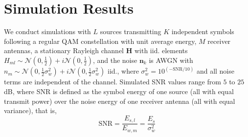 
\section{Simulation Results} \label{sec:simulations_wf}

%



We conduct simulations with $L$ sources transmitting $K$ independent symbols following a regular QAM constellation with unit average energy, $M$ receiver antennas, a stationary Rayleigh channel $\bm{H}$ with iid. elements $H_{ml}\sim\mathcal{N}(0,\frac{1}{2})+i\mathcal{N}(0,\frac{1}{2})$, and the noise $\bm{n}_k$ is AWGN with $n_m\sim \mathcal{N}(0,\frac{1}{2}\sigma_w^2)+i\mathcal{N}(0,\frac{1}{2}\sigma_w^2)$ iid., where $\sigma_w^2=10^{(-\text{SNR}/10)}$ and all noise terms are independent of the channel. Simulated SNR values range from $5$ to $25$ dB, where SNR is defined as the symbol energy of one source (all with equal transmit power) over the noise energy of one receiver antenna (all with equal variance), that is,
\begin{equation}
\text{SNR}=\frac{E_{s,l}}{E_{w,m}}=\frac{E_s}{\sigma_w^2}
\end{equation}

